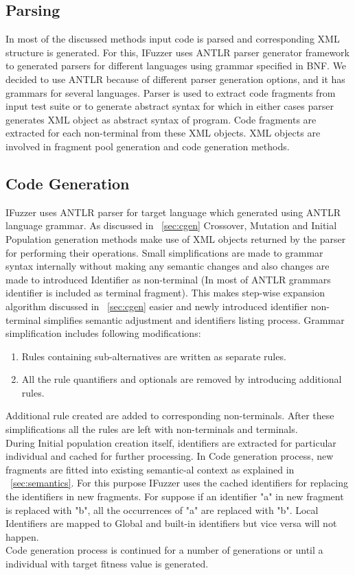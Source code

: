 \documentclass{sig-alternate}
\begin{document}
\subsection{Parsing}
\indent In most of the discussed methods input code is parsed and corresponding XML structure is generated. For this, IFuzzer uses ANTLR parser generator framework to generated parsers for different languages using grammar specified in BNF. We decided to use ANTLR because of different parser generation options, and it has grammars for several languages. Parser is used to extract code fragments from input test suite or to generate abstract syntax for which in either cases parser generates XML object as abstract syntax of program. Code fragments are extracted for each non-terminal from these XML objects. XML objects are involved in fragment pool generation and code generation methods.

\subsection{Code Generation}
\indent IFuzzer uses ANTLR parser for target language which generated using ANTLR language grammar. As discussed in ~\autoref{sec:cgen} Crossover, Mutation and Initial Population generation methods make use of XML objects returned by the parser for performing their operations. Small simplifications are made to grammar syntax internally without making any semantic changes and also changes are made to introduced Identifier as non-terminal (In most of ANTLR grammars identifier is included as terminal fragment). This makes step-wise expansion algorithm discussed in ~\autoref{sec:cgen} easier and newly introduced identifier non-terminal simplifies semantic adjustment and identifiers listing process. 
\indent Grammar simplification includes following modifications:
\begin{enumerate}
\item Rules containing sub-alternatives are written as separate rules.
\item All the rule quantifiers and optionals are removed by introducing additional rules.
\end{enumerate}
Additional rule created are added to corresponding non-terminals. After these simplifications all the rules are left with non-terminals and terminals.\\
\indent During Initial population creation itself, identifiers are extracted for particular individual and cached for further processing. In Code generation process, new fragments are fitted into existing semantic-al context as explained in ~\autoref{sec:semantics}. For this purpose IFuzzer uses the cached identifiers for replacing the identifiers in new fragments. For suppose if an identifier "a" in new fragment is replaced with "b", all the occurrences of "a" are replaced with "b". Local Identifiers are mapped to Global and built-in identifiers but vice versa will not happen.\\
\indent Code generation process is continued for a number of generations or until a individual with target fitness value is generated. 
\end{document}
